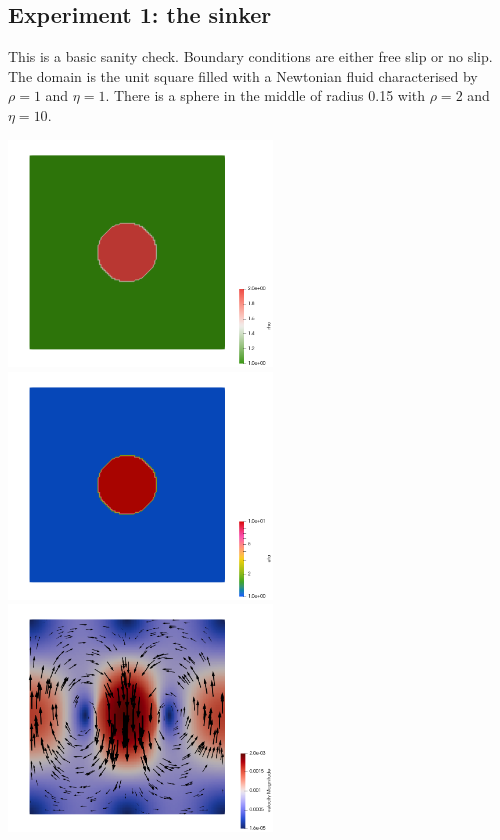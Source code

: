 \newpage
\subsection*{Experiment 1: the sinker}

This is a basic sanity check. Boundary conditions are either free slip or no slip.
The domain is the unit square filled with a Newtonian fluid characterised by 
$\rho=1$ and $\eta=1$. There is a sphere in the middle of radius 0.15 with $\rho=2$
and $\eta=10$.

\begin{center}
\includegraphics[width=7cm]{python_codes/fieldstone_158/results/exp1/rho}
\includegraphics[width=7cm]{python_codes/fieldstone_158/results/exp1/eta}\\
\includegraphics[width=7cm]{python_codes/fieldstone_158/results/exp1/vel}

\end{center}
